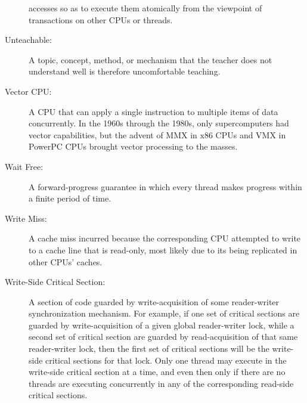 \begin{description}
	accesses so as to execute them atomically from the viewpoint
	of transactions on other CPUs or threads.
\item[Unteachable:]
	A topic, concept, method, or mechanism that the teacher does
	not understand well is therefore uncomfortable teaching.
\item[Vector CPU:]
	A CPU that can apply a single instruction to multiple items of
	data concurrently.
	In the 1960s through the 1980s, only supercomputers had vector
	capabilities, but the advent of MMX in x86 CPUs and VMX in
	PowerPC CPUs brought vector processing to the masses.
\item[Wait Free:]
	A forward-progress guarantee in which every thread makes
	progress within a finite period of time.
\item[Write Miss:]
	A cache miss incurred because the corresponding CPU attempted
	to write to a cache line that is read-only, most likely due
	to its being replicated in other CPUs' caches.
\item[Write-Side Critical Section:]
	A section of code guarded by write-acquisition of
	some reader-writer synchronization mechanism.
	For example, if one set of critical sections are guarded by
	write-acquisition of
	a given global reader-writer lock, while a second set of critical
	section are guarded by read-acquisition of that same reader-writer
	lock, then the first set of critical sections will be the
	write-side critical sections for that lock.
	Only one thread may execute in the write-side critical section
	at a time, and even then only if there are no threads are
	executing concurrently in any of the corresponding read-side
	critical sections.
\end{description}

